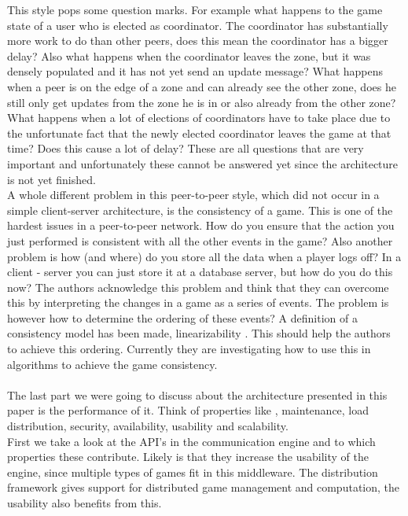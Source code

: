 \indent This style pops some question marks. For example what happens to the game state of a user who is elected as coordinator. The coordinator has substantially more work to do than other peers, does this mean the coordinator has a bigger delay? Also what happens when the coordinator leaves the zone, but it was densely populated and it has not yet send an update message? What happens when a peer is on the edge of a zone and can already see the other zone, does he still only get updates from the zone he is in or also already from the other zone? What happens when a lot of elections of coordinators have to take place due to the unfortunate fact that the newly elected coordinator leaves the game at that time? Does this cause a lot of delay? These are all questions that are very important and unfortunately these cannot be answered yet since the architecture is not yet finished. \\
\indent A whole different problem in this peer-to-peer style, which did not occur in a simple client-server architecture, is the consistency of a game. This is one of the hardest issues in a peer-to-peer network. How do you ensure that the action you just performed is consistent with all the other events in the game? Also another problem is how (and where) do you store all the data when a player logs off? In a client - server you can just store it at a database server, but how do you do this now? The authors acknowledge this problem and think that they can overcome this by interpreting the changes in a game as a series of events. The problem is however how to determine the ordering of these events? A definition of a consistency model has been made, linearizability \cite{linear}. This should help the authors to achieve this ordering. Currently they are investigating how to use this in algorithms to achieve the game consistency.\\
\\
The last part we were going to discuss about the architecture presented in this paper is the performance of it. Think of properties like , maintenance, load distribution, security, availability, usability and scalability. \\
\indent First we take a look at the API's in the communication engine and to which properties these contribute. Likely is that they increase the usability of the engine, since multiple types of games fit in this middleware. The distribution framework gives support for distributed game management and computation, the usability also benefits from this.\\

